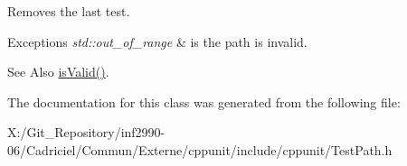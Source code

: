 Removes the last test. 
\begin{DoxyExceptions}{Exceptions}
{\em std\-::out\-\_\-of\-\_\-range} & is the path is invalid. \\
\hline
\end{DoxyExceptions}


\begin{DoxySeeAlso}{See Also}
\hyperlink{class_test_path_aca6ad4784df09af24573890d2d145435}{is\-Valid()}. 
\end{DoxySeeAlso}


The documentation for this class was generated from the following file\-:\begin{DoxyCompactItemize}
\item 
X\-:/\-Git\-\_\-\-Repository/inf2990-\/06/\-Cadriciel/\-Commun/\-Externe/cppunit/include/cppunit/Test\-Path.\-h\end{DoxyCompactItemize}
